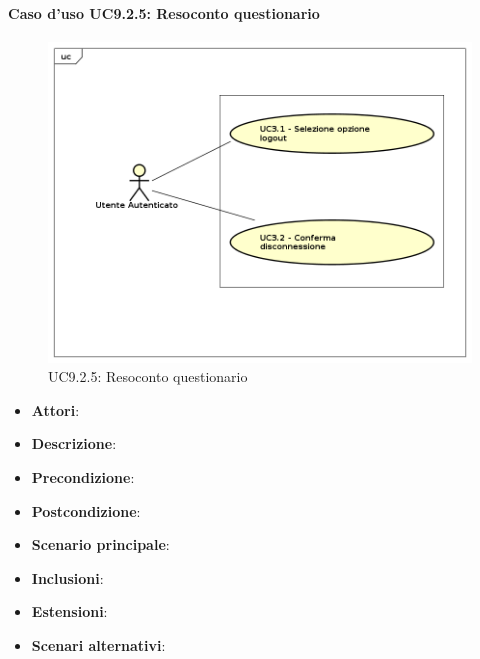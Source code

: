 		\paragraph{Caso d'uso UC9.2.5: Resoconto questionario}
		\label{UC9.2.5}
		\begin{figure}[h]
			\centering
		\includegraphics[scale=0.7,keepaspectratio]{UML/UC9.png}
			\caption{UC9.2.5: Resoconto questionario}
		\end{figure}
		\FloatBarrier
		\begin{itemize}
			\item \textbf{Attori}: 
			\item \textbf{Descrizione}: 
			\item \textbf{Precondizione}: 
			\item \textbf{Postcondizione}: 
			\item \textbf{Scenario principale}:
			\item \textbf{Inclusioni}:
			\item \textbf{Estensioni}:
			\item \textbf{Scenari alternativi}:
		\end{itemize}
		
